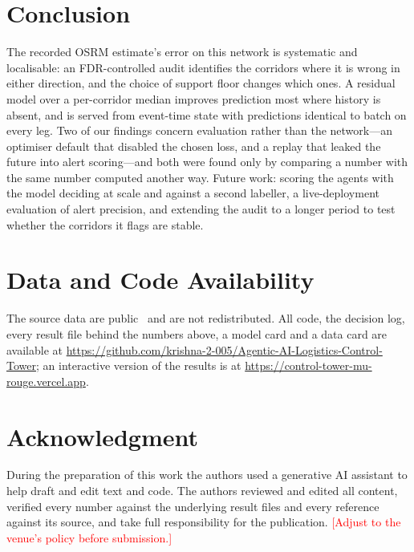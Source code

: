 \documentclass[conference]{IEEEtran}
\begin{document}
\section{Conclusion}

The recorded OSRM estimate's error on this network is systematic and localisable: an FDR-controlled audit identifies the corridors where it is wrong in either direction, and the choice of support floor changes which ones. A residual model over a per-corridor median improves prediction most where history is absent, and is served from event-time state with predictions identical to batch on every leg. Two of our findings concern evaluation rather than the network---an optimiser default that disabled the chosen loss, and a replay that leaked the future into alert scoring---and both were found only by comparing a number with the same number computed another way. Future work: scoring the agents with the model deciding at scale and against a second labeller, a live-deployment evaluation of alert precision, and extending the audit to a longer period to test whether the corridors it flags are stable.

\section*{Data and Code Availability}
The source data are public~\cite{delhivery} and are not redistributed. All code, the decision log, every result file behind the numbers above, a model card and a data card are available at \url{https://github.com/krishna-2-005/Agentic-AI-Logistics-Control-Tower}; an interactive version of the results is at \url{https://control-tower-mu-rouge.vercel.app}.

\section*{Acknowledgment}
During the preparation of this work the authors used a generative AI assistant to help draft and edit text and code. The authors reviewed and edited all content, verified every number against the underlying result files and every reference against its source, and take full responsibility for the publication. \textcolor{red}{[Adjust to the venue's policy before submission.]}



\end{document}
